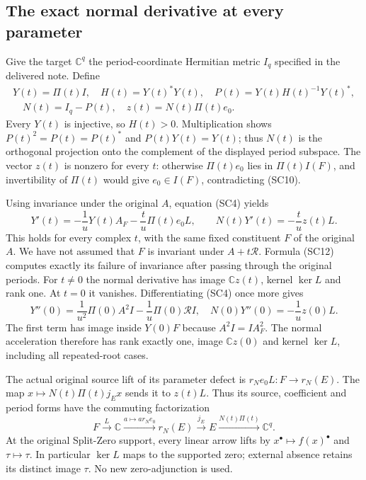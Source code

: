 \documentclass{article}
\begin{document}
\subsection{The exact normal derivative at every parameter}

Give the target $\mathbb C^q$ the period-coordinate Hermitian metric
$I_q$ specified in the delivered note.  Define
\[
 \begin{gathered}
 Y(t)=\Pi(t)I,
 \quad H(t)=Y(t)^*Y(t),
 \quad P(t)=Y(t)H(t)^{-1}Y(t)^*,\\
 \quad N(t)=I_q-P(t),
 \quad z(t)=N(t)\Pi(t)e_0.
 \end{gathered}
 \tag{SC11}
\]
Every $Y(t)$ is injective, so $H(t)>0$.  Multiplication shows
$P(t)^2=P(t)=P(t)^*$ and $P(t)Y(t)=Y(t)$; thus $N(t)$ is the
orthogonal projection onto the complement of the displayed period
subspace.  The vector $z(t)$ is nonzero for every $t$: otherwise
$\Pi(t)e_0$ lies in $\Pi(t)I(F)$, and invertibility of $\Pi(t)$ would
give $e_0\in I(F)$, contradicting (SC10).

Using invariance under the original $A$, equation (SC4) yields
\[
 Y'(t)=-\frac1uY(t)A_F-\frac t u\Pi(t)e_0L,
 \qquad
 \boxed{N(t)Y'(t)=-\frac t u z(t)L.}
 \tag{SC12}
\]
This holds for every complex $t$, with the same fixed constituent
$F$ of the original $A$.  We have not assumed that $F$ is invariant
under $A+t\mathcal R$.  Formula (SC12) computes exactly its failure
of invariance after passing through the original periods.  For
$t\ne0$ the normal derivative has image $\mathbb Cz(t)$, kernel
$\ker L$ and rank one.  At $t=0$ it vanishes.  Differentiating
(SC4) once more gives
\[
 Y''(0)=\frac1{u^2}\Pi(0)A^2I-\frac1u\Pi(0)\mathcal RI,
 \quad
 N(0)Y''(0)=-\frac1u z(0)L.
 \tag{SC13}
\]
The first term has image inside $Y(0)F$ because $A^2I=IA_F^2$.
The normal acceleration therefore has rank exactly one, image
$\mathbb Cz(0)$ and kernel $\ker L$, including all repeated-root cases.

The actual original source lift of its parameter defect is
$r_Ne_0L:F\to r_N(E)$.  The map
$x\mapsto N(t)\Pi(t)j_Ex$ sends it to $z(t)L$.
Thus its source, coefficient and period forms have the commuting
factorization
\[
 F\xrightarrow{L}\mathbb C\xrightarrow{a\mapsto ar_Ne_0}r_N(E)
 \xrightarrow{j_E}E\xrightarrow{N(t)\Pi(t)}\mathbb C^q.
 \tag{SC14}
\]
At the original Split-Zero support, every linear arrow lifts by
$x^\bullet\mapsto f(x)^\bullet$ and $\tau\mapsto\tau$.
In particular $\ker L$ maps to the supported zero; external absence
retains its distinct image $\tau$.  No new zero-adjunction is used.
\end{document}
